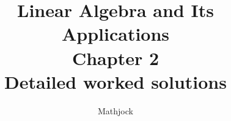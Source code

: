 
\title{\textbf{Linear Algebra and Its Applications}\\[0.3em]Chapter 2\\[0.3em]\large Detailed worked solutions}
\author{Mathjock}
\date{}

\maketitle
\bookinfo
\tableofcontents
\clearpage
\renewcommand{\thesection}{2.\arabic{section}}
\renewcommand{\theHsection}{2.\arabic{section}}
\setcounter{section}{0}

\clearpage
\renewcommand{\thesection}{2.\arabic{section}}
\renewcommand{\theHsection}{2.\arabic{section}}
\setcounter{section}{1}

\clearpage
\renewcommand{\thesection}{2.\arabic{section}}
\renewcommand{\theHsection}{2.\arabic{section}}
\setcounter{section}{2}

\clearpage
\renewcommand{\thesection}{2.\arabic{section}}
\renewcommand{\theHsection}{2.\arabic{section}}
\setcounter{section}{3}

\clearpage
\renewcommand{\thesection}{2.\arabic{section}}
\renewcommand{\theHsection}{2.\arabic{section}}
\setcounter{section}{4}

\clearpage
\renewcommand{\thesection}{2.\arabic{section}}
\renewcommand{\theHsection}{2.\arabic{section}}
\setcounter{section}{5}

\clearpage
\renewcommand{\thesection}{2.\arabic{section}}
\renewcommand{\theHsection}{2.\arabic{section}}
\setcounter{section}{6}

\clearpage
\renewcommand{\thesection}{2.\arabic{section}}
\renewcommand{\theHsection}{2.\arabic{section}}
\setcounter{section}{7}

\clearpage
\renewcommand{\thesection}{2.\arabic{section}}
\renewcommand{\theHsection}{2.\arabic{section}}
\setcounter{section}{8}

\clearpage
\renewcommand{\thesection}{2.S}
\renewcommand{\theHsection}{2.S}
\setcounter{section}{0}


